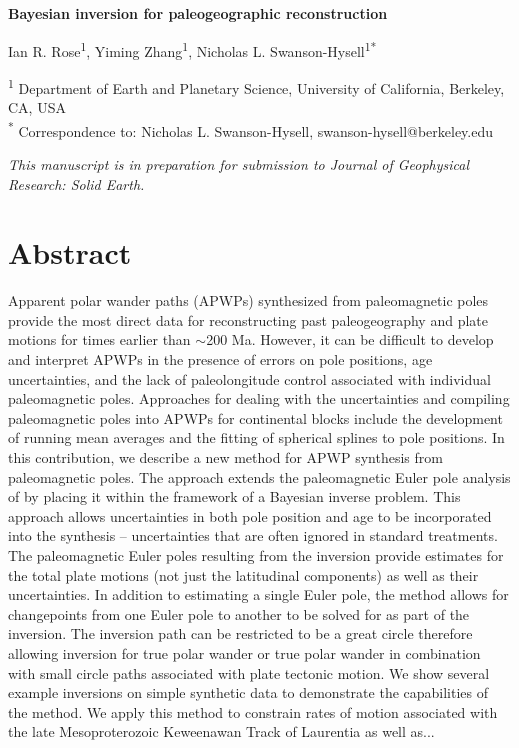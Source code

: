 \documentclass[11pt,letterpaper]{article}
\begin{document}
\begin{flushleft}
{\Large \textbf{Bayesian inversion for paleogeographic reconstruction}}

Ian R. Rose\textsuperscript{1},
Yiming Zhang\textsuperscript{1},
Nicholas L. Swanson-Hysell\textsuperscript{1}\textsuperscript{*}

\bigskip
\textsuperscript{1} Department of Earth and Planetary Science, University of California, Berkeley, CA, USA\\
\textsuperscript{*} Correspondence to: Nicholas L. Swanson-Hysell, swanson-hysell@berkeley.edu
\bigskip

\end{flushleft}

\noindent\textit{This manuscript is in preparation for submission to Journal of Geophysical Research: Solid Earth.}

\linenumbers

\section*{Abstract \label{sec:ABSTRACT}}

Apparent polar wander paths (APWPs) synthesized from paleomagnetic poles provide the most direct data for reconstructing past paleogeography and plate motions for times earlier than $\sim$200 Ma. However, it can be difficult to develop and interpret APWPs in the presence of errors on pole positions, age uncertainties, and the lack of paleolongitude control associated with individual paleomagnetic poles. Approaches for dealing with the uncertainties and compiling paleomagnetic poles into APWPs for continental blocks include the development of running mean averages and the fitting of spherical splines to pole positions. In this contribution, we describe a new method for APWP synthesis from paleomagnetic poles. The approach extends the paleomagnetic Euler pole analysis of \citet{Gordon1984a} by placing it within the framework of a Bayesian inverse problem. This approach allows uncertainties in both pole position and age to be incorporated into the synthesis -- uncertainties that are often ignored in standard treatments. The paleomagnetic Euler poles resulting from the inversion provide estimates for the total plate motions (not just the latitudinal components) as well as their uncertainties. In addition to estimating a single Euler pole, the method allows for changepoints from one Euler pole to another to be solved for as part of the inversion. The inversion path can be restricted to be a great circle therefore allowing inversion for true polar wander or true polar wander in combination with small circle paths associated with plate tectonic motion. We show several example inversions on simple synthetic data to demonstrate the capabilities of the method. We apply this method to constrain rates of motion associated with the late Mesoproterozoic Keweenawan Track of Laurentia as well as...
\end{document}
